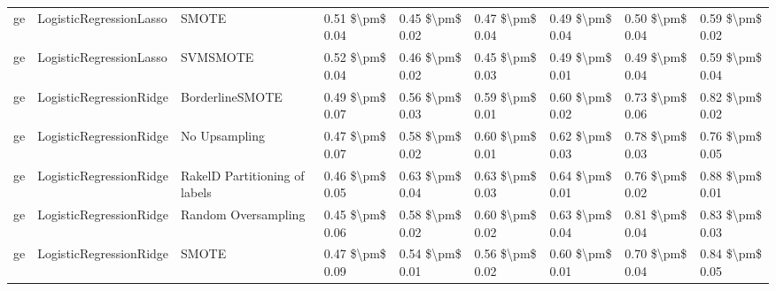 \begin{tabular}{lllllllll}
      ge &         LogisticRegressionLasso &                         SMOTE &     0.51 \$\textbackslash pm\$ 0.04 &           0.45 \$\textbackslash pm\$ 0.02 &       0.47 \$\textbackslash pm\$ 0.04 &        0.49 \$\textbackslash pm\$ 0.04 &                         0.50 \$\textbackslash pm\$ 0.04 &     0.59 \$\textbackslash pm\$ 0.02 \\
      ge &         LogisticRegressionLasso &                      SVMSMOTE &     0.52 \$\textbackslash pm\$ 0.04 &           0.46 \$\textbackslash pm\$ 0.02 &       0.45 \$\textbackslash pm\$ 0.03 &        0.49 \$\textbackslash pm\$ 0.01 &                         0.49 \$\textbackslash pm\$ 0.04 &     0.59 \$\textbackslash pm\$ 0.04 \\
      ge &         LogisticRegressionRidge &               BorderlineSMOTE &     0.49 \$\textbackslash pm\$ 0.07 &           0.56 \$\textbackslash pm\$ 0.03 &       0.59 \$\textbackslash pm\$ 0.01 &        0.60 \$\textbackslash pm\$ 0.02 &                         0.73 \$\textbackslash pm\$ 0.06 &     0.82 \$\textbackslash pm\$ 0.02 \\
      ge &         LogisticRegressionRidge &                 No Upsampling &     0.47 \$\textbackslash pm\$ 0.07 &           0.58 \$\textbackslash pm\$ 0.02 &       0.60 \$\textbackslash pm\$ 0.01 &        0.62 \$\textbackslash pm\$ 0.03 &                         0.78 \$\textbackslash pm\$ 0.03 &     0.76 \$\textbackslash pm\$ 0.05 \\
      ge &         LogisticRegressionRidge & RakelD Partitioning of labels &     0.46 \$\textbackslash pm\$ 0.05 &           0.63 \$\textbackslash pm\$ 0.04 &       0.63 \$\textbackslash pm\$ 0.03 &        0.64 \$\textbackslash pm\$ 0.01 &                         0.76 \$\textbackslash pm\$ 0.02 &     0.88 \$\textbackslash pm\$ 0.01 \\
      ge &         LogisticRegressionRidge &           Random Oversampling &     0.45 \$\textbackslash pm\$ 0.06 &           0.58 \$\textbackslash pm\$ 0.02 &       0.60 \$\textbackslash pm\$ 0.02 &        0.63 \$\textbackslash pm\$ 0.04 &                         0.81 \$\textbackslash pm\$ 0.04 &     0.83 \$\textbackslash pm\$ 0.03 \\
      ge &         LogisticRegressionRidge &                         SMOTE &     0.47 \$\textbackslash pm\$ 0.09 &           0.54 \$\textbackslash pm\$ 0.01 &       0.56 \$\textbackslash pm\$ 0.02 &        0.60 \$\textbackslash pm\$ 0.01 &                         0.70 \$\textbackslash pm\$ 0.04 &     0.84 \$\textbackslash pm\$ 0.05 \\

\end{tabular}
